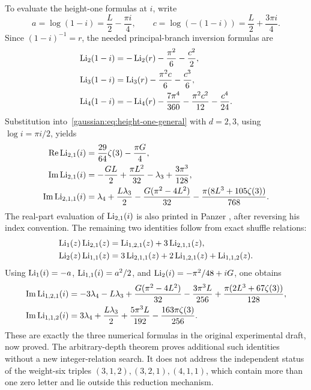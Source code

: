 To evaluate the height-one formulas at $i$, write
\[
 a=\log(1-i)=\frac L2-\frac{\pi i}{4},\qquad
 c=\log(-(1-i))=\frac L2+\frac{3\pi i}{4}.
\]
Since $(1-i)^{-1}=r$, the needed principal-branch inversion formulas are
\begin{align*}
 \operatorname{Li}_2(1-i)&=-\operatorname{Li}_2(r)-\frac{\pi^2}{6}-\frac{c^2}{2},\\
 \operatorname{Li}_3(1-i)&=\operatorname{Li}_3(r)-\frac{\pi^2c}{6}-\frac{c^3}{6},\\
 \operatorname{Li}_4(1-i)&=-\operatorname{Li}_4(r)-\frac{7\pi^4}{360}
                         -\frac{\pi^2c^2}{12}-\frac{c^4}{24}.
\end{align*}
Substitution into~\eqref{gaussian:eq:height-one-general} with $d=2,3$, using
$\log i=\pi i/2$, yields
\begin{align*}
 \operatorname{Re}\operatorname{Li}_{2,1}(i)&=\frac{29}{64}\zeta(3)-\frac{\pi G}{4},\\
 \operatorname{Im}\operatorname{Li}_{2,1}(i)&=-\frac{GL}{2}
                   +\frac{\pi L^2}{32}-\lambda_3+\frac{3\pi^3}{128},\\
 \operatorname{Im}\operatorname{Li}_{2,1,1}(i)&=
 \lambda_4+\frac{L\lambda_3}{2}
 -\frac{G(\pi^2-4L^2)}{32}
 -\frac{\pi(8L^3+105\zeta(3))}{768}.
\end{align*}
The real-part evaluation of $\operatorname{Li}_{2,1}(i)$ is also printed in
Panzer \cite{Panzer2017}, after reversing his index convention.
The remaining two identities follow from exact shuffle relations:
\begin{align*}
 \operatorname{Li}_1(z)\operatorname{Li}_{2,1}(z)
    &=\operatorname{Li}_{1,2,1}(z)+3\operatorname{Li}_{2,1,1}(z),\\
 \operatorname{Li}_2(z)\operatorname{Li}_{1,1}(z)
    &=3\operatorname{Li}_{2,1,1}(z)+2\operatorname{Li}_{1,2,1}(z)+\operatorname{Li}_{1,1,2}(z).
\end{align*}
Using $\operatorname{Li}_1(i)=-a$, $\operatorname{Li}_{1,1}(i)=a^2/2$, and
$\operatorname{Li}_2(i)=-\pi^2/48+iG$, one obtains
\begin{align*}
 \operatorname{Im}\operatorname{Li}_{1,2,1}(i)
 &=-3\lambda_4-L\lambda_3
   +\frac{G(\pi^2-4L^2)}{32}
   -\frac{3\pi^3L}{256}
   +\frac{\pi(2L^3+67\zeta(3))}{128},\\
 \operatorname{Im}\operatorname{Li}_{1,1,2}(i)
 &=3\lambda_4+\frac{L\lambda_3}{2}
   +\frac{5\pi^3L}{192}-\frac{163\pi\zeta(3)}{256}.
\end{align*}
These are exactly the three numerical formulas in the original experimental draft,
now proved. The arbitrary-depth theorem proves additional such identities
without a new integer-relation search. It does not address the independent
status of the weight-six triples $(3,1,2),(3,2,1),(4,1,1)$, which contain
more than one zero letter and lie outside this reduction mechanism.




